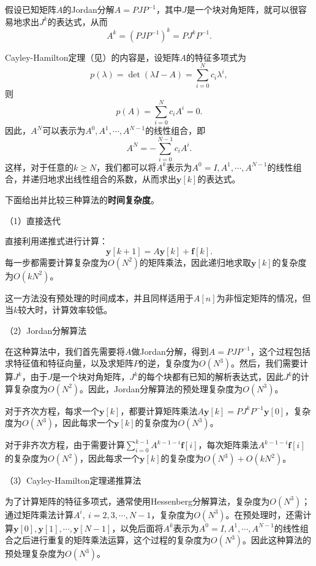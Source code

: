 假设已知矩阵$A$的Jordan分解$A=PJP^{-1}$，其中$J$是一个块对角矩阵，就可以很容易地求出$J^k$的表达式，从而
\begin{equation}
    A^k=(PJP^{-1})^k=PJ^k P^{-1}.
\end{equation}

Cayley-Hamilton定理（见）的内容是，设矩阵$A$的特征多项式为
\begin{equation}
    p(\lambda)=\det(\lambda I-A)=\sum_{i=0}^{N}c_i\lambda^i,
\end{equation}
则
\begin{equation}
    p(A)=\sum_{i=0}^{N}c_i A^i=0.
\end{equation}
因此，$A^N$可以表示为$A^0,A^1,\cdots,A^{N-1}$的线性组合，即
\begin{equation}
    A^N=-\sum_{i=0}^{N-1}c_i A^i.
\end{equation}
这样，对于任意的$k\geq N$，我们都可以将$A^k$表示为$A^0=I,A^1,\cdots,A^{N-1}$的线性组合，并递归地求出线性组合的系数，从而求出$\mathbf{y}[k]$的表达式。

下面给出并比较三种算法的\textbf{时间复杂度}。

（1）直接迭代

直接利用递推式进行计算：
\begin{equation}
    \mathbf{y}[k+1]=A\mathbf{y}[k]+\mathbf{f}[k].
\end{equation}
每一步都需要计算复杂度为$O(N^2)$的矩阵乘法，因此递归地求取$\mathbf{y}[k]$的复杂度为$O(k N^2)$。

这一方法没有预处理的时间成本，并且同样适用于$A[n]$为非恒定矩阵的情况，但当$k$较大时，计算效率较低。

（2）Jordan分解算法

在这种算法中，我们首先需要将$A$做Jordan分解，得到$A=PJP^{-1}$，这个过程包括求特征值和特征向量，以及求矩阵$P$的逆，复杂度为$O(N^3)$。然后，我们需要计算$J^k$，由于$J$是一个块对角矩阵，$J^k$的每个块都有已知的解析表达式，因此$J^k$的计算复杂度为$O(N^2)$。因此，Jordan分解算法的预处理复杂度为$O(N^3)$。

对于齐次方程，每求一个$\mathbf{y}[k]$，都要计算矩阵乘法$A\mathbf{y}[k]=PJ^k P^{-1}\mathbf{y}[0]$，复杂度为$O(N^3)$，因此每求一个$\mathbf{y}[k]$的复杂度为$O(N^3)$。

对于非齐次方程，由于需要计算$\sum_{i=0}^{k-1}A^{k-1-i}\mathbf{f}[i]$，每次矩阵乘法$A^{k-1-i}\mathbf{f}[i]$的复杂度为$O(N^2)$，因此每求一个$\mathbf{y}[k]$的复杂度为$O(N^3)+O(k N^2)$。

（3）Cayley-Hamilton定理递推算法

为了计算矩阵的特征多项式，通常使用Hessenberg分解算法，复杂度为$O(N^3)$；通过矩阵乘法计算$A^i,\ i=2,3,\cdots,N-1$，复杂度为$O(N^3)$。在预处理时，还需计算$\mathbf{y}[0],\mathbf{y}[1],\cdots,\mathbf{y}[N-1]$，以免后面将$A^k$表示为$A^0=I,A^1,\cdots,A^{N-1}$的线性组合之后进行重复的矩阵乘法运算，这个过程的复杂度为$O(N^3)$。因此这种算法的预处理复杂度为$O(N^3)$。

